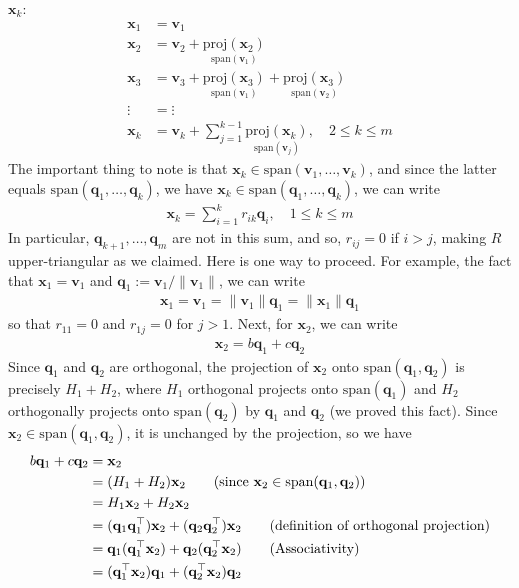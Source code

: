 \documentclass[12pt, a4paper]{article}
\theoremstyle{definition}
\begin{document}
	$\mathbf{x}_k$:
	\begin{align*}
		\mathbf{x}_1 &= \mathbf{v}_1\\
		\mathbf{x}_2 &= \mathbf{v}_2
		+ \underset{\text{span}(\mathbf{v}_1)}{\text{proj}(\mathbf{x}_2)}\\
		\mathbf{x}_3 &= \mathbf{v}_3
		+ \underset{\text{span}(\mathbf{v}_1)}{\text{proj}(\mathbf{x}_3)}
		+ \underset{\text{span}(\mathbf{v}_2)}{\text{proj}(\mathbf{x}_3)}\\
		\vdots &= \vdots\\
		\mathbf{x}_k &= \mathbf{v}_k
		+ \sum_{j=1}^{k-1}\underset{\text{span}(\mathbf{v}_j)}{\text{proj}(\mathbf{x}_k)},
		\quad 2\leq k\leq m
	\end{align*}
	The important thing to note is that
	$\mathbf{x}_k\in \text{span}(\mathbf{v}_1,\ldots,\mathbf{v}_k)$, and since the latter
	equals $\text{span}(\mathbf{q}_1,\ldots,\mathbf{q}_k)$, 
	we have $\mathbf{x}_k\in \text{span}(\mathbf{q}_1,\ldots, \mathbf{q}_k)$, we can
	write
	\begin{align*}
		\mathbf{x}_k = \sum_{i=1}^{k}r_{ik}\mathbf{q}_i,\quad 1\leq k\leq m
	\end{align*}
	In particular, $\mathbf{q}_{k+1},\ldots,\mathbf{q}_m$ are not in this sum, and so,
	$r_{ij}=0$ if $i>j$, making $R$ upper-triangular as we claimed.
	Here is one way to proceed. For example, the fact that $\mathbf{x}_1=\mathbf{v}_1$
	and $\mathbf{q}_1:=\mathbf{v}_1/\|\mathbf{v}_1\|$, we can write
	\begin{align*}
		\mathbf{x}_1 = \mathbf{v}_1 = \|\mathbf{v}_1\|\mathbf{q}_1 = \|\mathbf{x}_1\| \mathbf{q}_1
	\end{align*}
	so that $r_{11}=0$ and $r_{1j}=0$ for $j>1$. Next, for $\mathbf{x}_2$, we can write
	\begin{align*}
		\mathbf{x}_2=b\mathbf{q}_1 + c\mathbf{q}_2
	\end{align*}
	Since $\mathbf{q}_1$ and $\mathbf{q}_2$ are orthogonal, the projection of $\mathbf{x}_2$ onto
	$\text{span}(\mathbf{q}_1,\mathbf{q}_2)$ is precisely $H_1+H_2$, where $H_1$ orthogonal
	projects onto $\text{span}(\mathbf{q}_1)$ and $H_2$ orthogonally projects onto
	$\text{span}(\mathbf{q}_2)$ by $\mathbf{q}_1$ and $\mathbf{q}_2$ (we proved this fact).
	Since $\mathbf{x}_2\in \text{span}(\mathbf{q}_1,\mathbf{q}_2)$, it is unchanged
	by the projection, so we have
	\begin{align*}
		b\mathbf{q}_1+c\mathbf{q}_2
		&=\mathbf{x}_2\\
		&=(H_1+H_2)\mathbf{x}_2
		\tag{\text{since $\mathbf{x}_2\in\text{span}(\mathbf{q}_1,\mathbf{q}_2)$}}\\
		&= H_1\mathbf{x}_2 + H_2\mathbf{x}_2\\
		&= (\mathbf{q}_1\mathbf{q}_1^\top)\mathbf{x}_2+(\mathbf{q}_2\mathbf{q}_2^\top)\mathbf{x}_2
		\tag{definition of orthogonal projection}\\
		&=\mathbf{q}_1(\mathbf{q}_1^\top \mathbf{x}_2)
		+\mathbf{q}_2(\mathbf{q}_2^\top \mathbf{x}_2)
		\tag{Associativity}\\
		&=(\mathbf{q}_1^\top \mathbf{x}_2)\mathbf{q}_1
		+(\mathbf{q}_2^\top \mathbf{x}_2)\mathbf{q}_2
	\end{align*}
\end{document}
